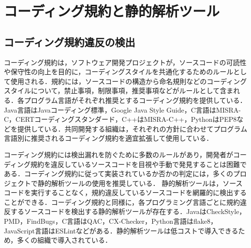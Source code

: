 \documentclass[T,J]{fose} %
\begin{document}

\section{コーディング規約と静的解析ツール}\label{sec:background}
\subsection{コーディング規約違反の検出}

コーディング規約は，ソフトウェア開発プロジェクトが，ソースコードの可読性や保守性の向上を目的に，コーディングスタイルを共通化するためのルールとして使用される．規約には，ソースコードの構造から命名規則などのコーディングスタイルについて，禁止事項，制限事項，推奨事項などがルールとして含まれる．各プログラム言語がそれぞれ推奨とするコーディング規約を提供している．Java言語はJavaコーディング標準，Google Java Style Guide，C言語はMISRA-C，CERTコーディングスタンダード，C++はMISRA-C++，PythonはPEP8などを提供している．共同開発する組織は，それぞれの方針に合わせてプログラム言語別に推奨されるコーディング規約を適宜拡張して使用している．


コーディング規約には検出漏れを防ぐために多数のルールがあり，開発者がコーディング規約を違反しているソースコードを目視や手動で発見することは困難である．コーディング規約に従って実装されているか否かの判定には，多くのプロジェクトで静的解析ツールの使用を推奨している\cite{}．
静的解析ツールは，ソースコードを実行することなく，規約違反しているソースコードを網羅的に検出することができる．コーディング規約と同様に，各プログラミング言語ごとに規約違反するソースコードを検出する静的解析ツールが存在する．JavaはCheckStyle，PMD，FindBugs，C言語はQAC，CX-Checker，Python言語はflake8，JavaScript言語はESLintなどがある．静的解析ツールは低コストで導入できるため，多くの組織で導入されている\cite{UsingStaticAnalysisTools1}\cite{UsingStaticAnalysisTools2}．
\end{document}
